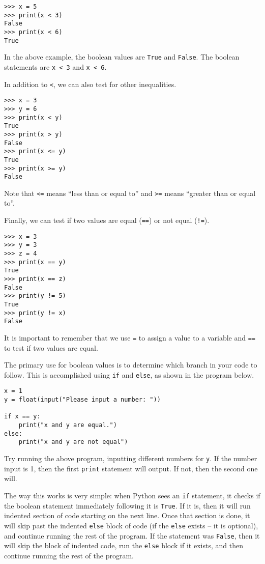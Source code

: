 \documentclass[12pt,hidelinks]{article}
\begin{document}
\begin{lstlisting}[style=bash]
>>> x = 5
>>> print(x < 3)
False
>>> print(x < 6)
True
\end{lstlisting}

In the above example, the boolean values are \texttt{True} and \texttt{False}. The boolean statements are \texttt{x < 3} and \texttt{x < 6}.

In addition to \texttt{<}, we can also test for other inequalities.

\begin{lstlisting}[style=bash]
>>> x = 3
>>> y = 6
>>> print(x < y)
True
>>> print(x > y)
False
>>> print(x <= y)
True
>>> print(x >= y)
False
\end{lstlisting}

Note that \texttt{<=} means ``less than or equal to'' and \texttt{>=} means ``greater than or equal to''.

Finally, we can test if two values are equal (\texttt{==}) or not equal (\texttt{!=}).

\begin{lstlisting}[style=bash]
>>> x = 3
>>> y = 3
>>> z = 4
>>> print(x == y)
True
>>> print(x == z)
False
>>> print(y != 5)
True
>>> print(y != x)
False
\end{lstlisting}

It is important to remember that we use \texttt{=} to assign a value to a variable and \texttt{==} to test if two values are equal.

The primary use for boolean values is to determine which branch in your code to follow. This is accomplished using \texttt{if} and \texttt{else}, as shown in the program below.

\begin{lstlisting}[style=python]
x = 1
y = float(input("Please input a number: "))

if x == y:
    print("x and y are equal.")
else:
    print("x and y are not equal")
\end{lstlisting}

Try running the above program, inputting different numbers for \texttt{y}. If the number input is 1, then the first \texttt{print} statement will output. If not, then the second one will.

The way this works is very simple: when Python sees an \texttt{if} statement, it checks if the boolean statement immediately following it is \texttt{True}. If it is, then it will run indented section of code starting on the next line. Once that section is done, it will skip past the indented \texttt{else} block of code (if the \texttt{else} exists -- it is optional), and continue running the rest of the program. If the statement was \texttt{False}, then it will skip the block of indented code, run the \texttt{else} block if it exists, and then continue running the rest of the program.
\end{document}
